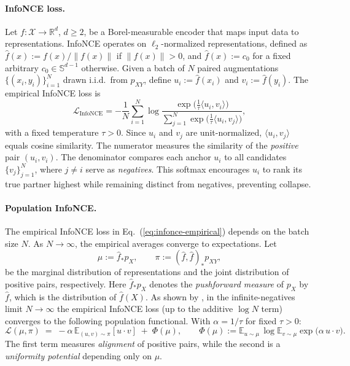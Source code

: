 \documentclass{article}
\newcommand{\E}{\mathbb{E}}
\newcommand{\R}{\mathbb{R}}
\newcommand{\Sph}{\mathbb{S}}
\renewcommand{\eqref}[1]{Eq.~(\ref{#1})}
\begin{document}
\paragraph{InfoNCE loss.}
Let $f:\mathcal X \to \R^d$, $d \ge 2$, be a Borel-measurable encoder that maps input data to representations.
InfoNCE operates on $\ell_2$-normalized representations, defined as $\hat f(x) := f(x)/\|f(x)\|$ if $\|f(x)\|>0$, and $\hat f(x):=c_0$ for a fixed arbitrary $c_0\in\Sph^{d-1}$ otherwise.
Given a batch of $N$ paired augmentations $\{(x_i,y_i)\}_{i=1}^N$ drawn i.i.d.\ from $p_{XY}$, define
$u_i := \hat f(x_i)$ and $v_i := \hat f(y_i)$.
The empirical InfoNCE loss is
\begin{equation}
\label{eq:infonce-empirical}
\mathcal L_{\mathrm{InfoNCE}}
= - \frac{1}{N} \sum_{i=1}^N 
\log \frac{\exp\!\big(\tfrac{1}{\tau}\langle u_i, v_i\rangle\big)}
{\sum_{j=1}^N \exp\!\big(\tfrac{1}{\tau}\langle u_i, v_j\rangle\big)},
\end{equation}
with a fixed temperature $\tau>0$. 
Since $u_i$ and $v_j$ are unit-normalized, $\langle u_i,v_j\rangle$ equals cosine similarity. 
The numerator measures the similarity of the \emph{positive} pair $(u_i,v_i)$. 
The denominator compares each anchor $u_i$ to all candidates $\{v_j\}_{j=1}^N$, where $j\neq i$ serve as \emph{negatives}. 
This softmax encourages $u_i$ to rank its true partner highest while remaining distinct from negatives, preventing collapse.


\paragraph{Population InfoNCE.}  
The empirical InfoNCE loss in \eqref{eq:infonce-empirical} depends on the batch size $N$.  
As $N \to \infty$, the empirical averages converge to expectations. 
% 
Let 
\begin{equation}
\label{eq:marginals}
\mu := \hat{f}_* p_X, 
\qquad 
\pi := (\hat f,\hat f)_* p_{XY},
\end{equation}
be the marginal distribution of representations and the joint distribution of positive pairs, respectively. 
Here $\hat f_* p_X$ denotes the \emph{pushforward measure} of $p_X$ by $\hat f$, which is the distribution of $\hat{f}(X)$. 
As shown by \citet[Theorem~1, Eq.~(2)]{wang2020understanding}, in the infinite-negatives limit {$N \to \infty$} the empirical InfoNCE loss (up to the additive $\log N$ term) converges to the following population functional.  
With $\alpha=1/\tau$ for fixed $\tau>0$:
\begin{equation}
\label{eq:pop}
\mathcal L(\mu,\pi)
\;=\; -\alpha\, \E_{(u,v)\sim\pi}[u\!\cdot\! v] 
\;+\; \Phi(\mu),
\qquad 
\Phi(\mu):= \E_{u\sim\mu}\,\log \E_{v\sim\mu} \exp\!\big(\alpha\, u\!\cdot\! v\big).
\end{equation}
The first term measures \emph{alignment} of positive pairs, while the second is a \emph{uniformity potential} depending only on $\mu$. 
\end{document}
